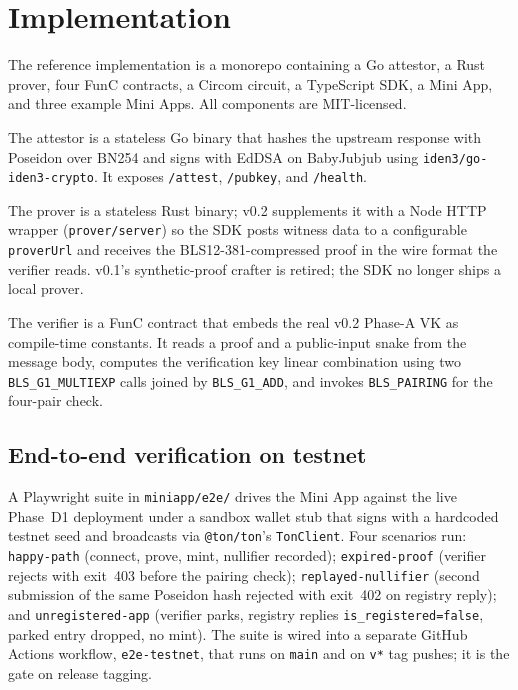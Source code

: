 \documentclass[11pt,a4paper]{article}
\begin{document}
\section{Implementation}\label{sec:impl}

The reference implementation is a monorepo containing a Go attestor,
a Rust prover, four FunC contracts, a Circom circuit, a TypeScript
SDK, a Mini App, and three example Mini Apps. All components are
MIT-licensed.

The attestor is a stateless Go binary that hashes the upstream
response with Poseidon over BN254 and signs with EdDSA on BabyJubjub
using \texttt{iden3/go-iden3-crypto}. It exposes \texttt{/attest},
\texttt{/pubkey}, and \texttt{/health}.

The prover is a stateless Rust binary; v0.2 supplements it with a
Node HTTP wrapper (\texttt{prover/server}) so the SDK posts witness
data to a configurable \texttt{proverUrl} and receives the
BLS12-381-compressed proof in the wire format the verifier reads.
v0.1's synthetic-proof crafter is retired; the SDK no longer ships a
local prover.

The verifier is a FunC contract that embeds the real v0.2 Phase-A VK
as compile-time constants. It reads a proof and a public-input snake
from the message body, computes the verification key linear
combination using two \texttt{BLS\_G1\_MULTIEXP} calls joined by
\texttt{BLS\_G1\_ADD}, and invokes \texttt{BLS\_PAIRING} for the
four-pair check.

\subsection{End-to-end verification on testnet}

A Playwright suite in \texttt{miniapp/e2e/} drives the Mini App
against the live Phase~D1 deployment under a sandbox wallet stub
that signs with a hardcoded testnet seed and broadcasts via
\texttt{@ton/ton}'s \texttt{TonClient}. Four scenarios run:
\texttt{happy-path} (connect, prove, mint, nullifier recorded);
\texttt{expired-proof} (verifier rejects with exit~403 before the
pairing check); \texttt{replayed-nullifier} (second submission of
the same Poseidon hash rejected with exit~402 on registry reply);
and \texttt{unregistered-app} (verifier parks, registry replies
\texttt{is\_registered=false}, parked entry dropped, no mint). The
suite is wired into a separate GitHub Actions workflow,
\texttt{e2e-testnet}, that runs on \texttt{main} and on \texttt{v*}
tag pushes; it is the gate on release tagging.
\end{document}
